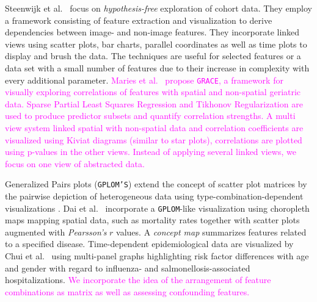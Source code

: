 \documentclass[journal]{style/vgtc} 			          %
\newcommand{\magenta}[1]{\textcolor{magenta}{#1}}
\begin{document}
Steenwijk et al.~\cite{Steenwijk} focus on \emph{hypothesis-free} exploration of cohort data.
They employ a framework consisting of feature extraction and visualization to derive dependencies between image- and non-image features.
They incorporate linked views using scatter plots, bar charts, parallel coordinates as well as time plots to display and brush the data.
The techniques are useful for selected features or a data set with a small number of features due to their increase in complexity with every additional parameter.
\magenta{
Maries et al.~\cite{GRACE} propose \texttt{GRACE}, a framework for visually exploring correlations of features with spatial and non-spatial geriatric data.
Sparse Partial Least Squares Regression and Tikhonov Regularization are used to produce predictor subsets and quantify correlation strengths.
A multi view system linked spatial with non-spatial data and correlation coefficients are visualized using Kiviat diagrams (similar to star plots), correlations are plotted using p-values in the other views.
Instead of applying several linked views, we focus on one view of abstracted data.
}

Generalized Pairs plots (\texttt{GPLOM'S}) extend the concept of scatter plot matrices by the pairwise depiction of heterogeneous data using type-combination-dependent visualizations \cite{GPLOMS, Francois2013}.
Dai et al.~\cite{Dai2005} incorporate a \texttt{GPLOM}-like visualization using choropleth maps mapping spatial data, such as mortality rates together with scatter plots augmented with \emph{Pearsson's} $r$ values.
A \emph{concept map} summarizes features related to a specified disease.
Time-dependent epidemiological data are visualized by Chui et al.~\cite{Chui2011} using multi-panel graphs highlighting risk factor differences with age and gender with regard to influenza- and salmonellosis-associated hospitalizations.
\magenta{
We incorporate the idea of the arrangement of feature combinations as matrix as well as assessing confounding features.
}
\end{document}
